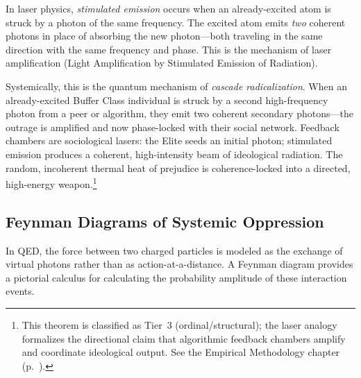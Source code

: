 \begin{theorem}
In laser physics, \emph{stimulated emission} occurs when an already-excited atom is struck by a photon of the same frequency. The excited atom emits \emph{two} coherent photons in place of absorbing the new photon---both traveling in the same direction with the same frequency and phase. This is the mechanism of laser amplification (Light Amplification by Stimulated Emission of Radiation).

Systemically, this is the quantum mechanism of \emph{cascade radicalization}. When an already-excited Buffer Class individual is struck by a second high-frequency photon from a peer or algorithm, they emit two coherent secondary photons---the outrage is amplified and now phase-locked with their social network. Feedback chambers are sociological lasers: the Elite seeds an initial photon; stimulated emission produces a coherent, high-intensity beam of ideological radiation. The random, incoherent thermal heat of prejudice is coherence-locked into a directed, high-energy weapon.\footnote{This theorem is classified as Tier~3 (ordinal/structural); the laser analogy formalizes the directional claim that algorithmic feedback chambers amplify and coordinate ideological output. See the Empirical Methodology chapter (p.~\pageref{ch:empirical_methodology}).}
\end{theorem}

\subsection{Feynman Diagrams of Systemic Oppression}

In QED, the force between two charged particles is modeled as the exchange of virtual photons rather than as action-at-a-distance. A Feynman diagram provides a pictorial calculus for calculating the probability amplitude of these interaction events.

